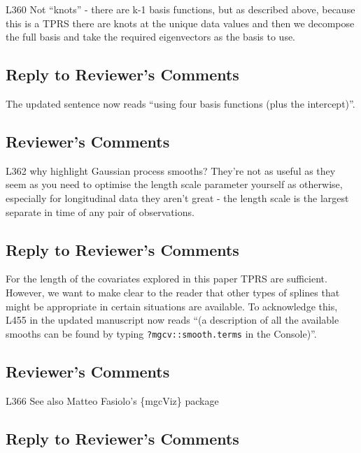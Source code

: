 \documentclass[
]{article}
\newcommand{\passthrough}[1]{#1}
\begin{document}
L360 Not ``knots'' - there are k-1 basis functions, but as described above, because this is a TPRS there are knots at the unique data values and then we decompose the full basis and take the required eigenvectors as the basis to use.

\hypertarget{section-29}{%
\subsection{\texorpdfstring{\textcolor{reviewersblue} {Reply to Reviewer's Comments}}{}}\label{section-29}}

The updated sentence now reads ``using four basis functions (plus the intercept)''.

\hypertarget{reviewers-comments-29}{%
\subsection{Reviewer's Comments}\label{reviewers-comments-29}}

L362 why highlight Gaussian process smooths? They're not as useful as they seem as you need to optimise the length scale parameter yourself as otherwise, especially for longitudinal data they aren't great - the length scale is the largest separate in time of any pair of observations.

\hypertarget{section-30}{%
\subsection{\texorpdfstring{\textcolor{reviewersblue} {Reply to Reviewer's Comments}}{}}\label{section-30}}

For the length of the covariates explored in this paper TPRS are sufficient. However, we want to make clear to the reader that other types of splines that might be appropriate in certain situations are available. To acknowledge this, L455 in the updated manuscript now reads ``(a description of all the available smooths can be found by typing \passthrough{\lstinline!?mgcv::smooth.terms!} in the Console)''.

\hypertarget{reviewers-comments-30}{%
\subsection{Reviewer's Comments}\label{reviewers-comments-30}}

L366 See also Matteo Fasiolo's \{mgcViz\} package

\hypertarget{section-31}{%
\subsection{\texorpdfstring{\textcolor{reviewersblue} {Reply to Reviewer's Comments}}{}}\label{section-31}}
\end{document}
